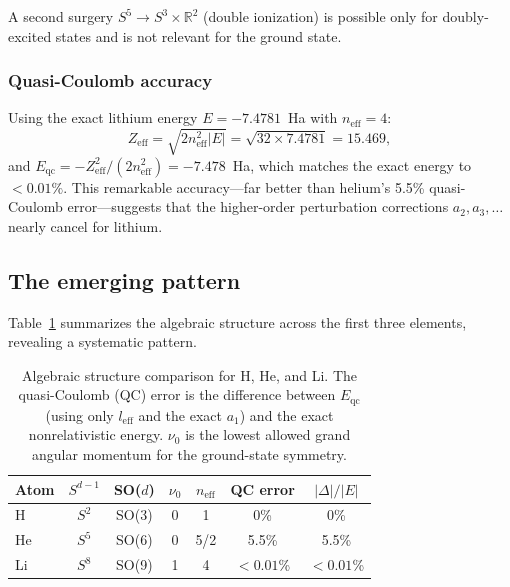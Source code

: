 \documentclass[aps,pra,twocolumn,superscriptaddress,longbibliography]{revtex4-2}
\begin{document}
A second surgery $S^5 \to S^3 \times \mathbb{R}^2$ (double
ionization) is possible only for doubly-excited states and is
not relevant for the ground state.

\subsubsection{Quasi-Coulomb accuracy}

Using the exact lithium energy $E = -7.4781$~Ha with
$n_{\mathrm{eff}} = 4$:
\begin{equation}
  Z_{\mathrm{eff}} = \sqrt{2 n_{\mathrm{eff}}^2 |E|}
  = \sqrt{32 \times 7.4781} = 15.469,
\end{equation}
and $E_{\mathrm{qc}} = -Z_{\mathrm{eff}}^2/(2 n_{\mathrm{eff}}^2)
= -7.478$~Ha, which matches the exact energy to $< 0.01\%$.
This remarkable accuracy---far better than helium's 5.5\% quasi-Coulomb
error---suggests that the higher-order perturbation corrections
$a_2, a_3, \ldots$ nearly cancel for lithium.

\subsection{The emerging pattern}
\label{sec:pattern}

Table~\ref{tab:pattern} summarizes the algebraic structure across
the first three elements, revealing a systematic pattern.

\begin{table}[h]
\caption{Algebraic structure comparison for H, He, and Li.  The
quasi-Coulomb (QC) error is the difference between $E_{\mathrm{qc}}$
(using only $l_{\mathrm{eff}}$ and the exact $a_1$) and the exact
nonrelativistic energy.  $\nu_0$ is the lowest allowed grand
angular momentum for the ground-state symmetry.}
\label{tab:pattern}
\begin{ruledtabular}
\begin{tabular}{lcccccc}
  Atom & $S^{d-1}$ & SO($d$) & $\nu_0$ & $n_{\mathrm{eff}}$
  & QC error & $|\Delta|/|E|$ \\
  \hline
  H  & $S^2$ & SO(3) & 0 & 1   & 0\%   & 0\% \\
  He & $S^5$ & SO(6) & 0 & 5/2 & 5.5\% & 5.5\% \\
  Li & $S^8$ & SO(9) & 1 & 4   & $<0.01$\% & $<0.01$\% \\
\end{tabular}
\end{ruledtabular}
\end{table}
\end{document}
